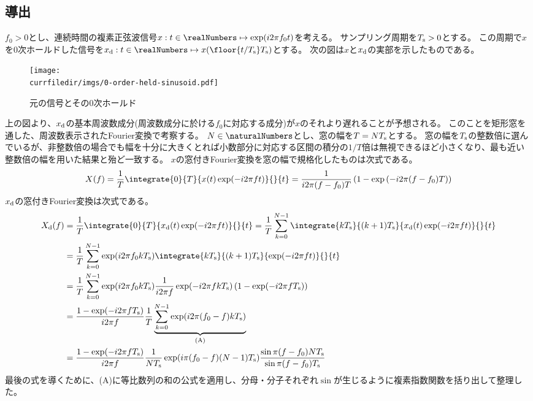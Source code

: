         \subsection{導出}
            $f_0>0$とし、連続時間の複素正弦波信号$x:t\in\realNumbers\mapsto\exp(i 2\pi f_0 t)$を考える。
            サンプリング周期を$T_\text{s}>0$とする。
            この周期で$x$を0次ホールドした信号を$\xd:t\in\realNumbers\mapsto x(\floor{t/\Ts}\Ts)$とする。
            次の図は$x$と$x_\text{d}$の実部を示したものである。
            \begin{figure}[H]
                \centering
                \texttt{[image: \\currfiledir/imgs/0-order-held-sinusoid.pdf]}
                \caption{元の信号とその0次ホールド}
            \end{figure}
            上の図より、$x_\text{d}$の基本周波数成分(周波数成分に於ける$f_0$に対応する成分)が$x$のそれより遅れることが予想される。
            このことを矩形窓を通した、周波数表示されたFourier変換で考察する。
            $N\in\naturalNumbers$とし、窓の幅を$T=NT_\text{s}$とする。
            窓の幅を$T_\text{s}$の整数倍に選んでいるが、非整数倍の場合でも幅を十分に大きくとれば小数部分に対応する区間の積分の$1/T$倍は無視できるほど小さくなり、最も近い整数倍の幅を用いた結果と殆ど一致する。
            $x$の窓付きFourier変換を窓の幅で規格化したものは次式である。
            \[ X(f) = \frac{1}{T} \integrate{0}{T}{x(t)\exp(-i 2\pi f t)}{}{t} = \frac{1}{i 2\pi(f-f_0)T}\left(1-\exp\left(-i 2\pi(f-f_0)T\right)\right) \]
            $x_\text{d}$の窓付きFourier変換は次式である。
            \begin{align*}
                \Xd(f) &= \frac{1}{T}\integrate{0}{T}{\xd(t)\exp(-i 2\pi f t)}{}{t} = \frac{1}{T}\sum_{k=0}^{N-1}\integrate{k\Ts}{(k+1)\Ts}{\xd(t)\exp(-i 2\pi f t)}{}{t} \\
                &= \frac{1}{T}\sum_{k=0}^{N-1}\exp(i 2\pi f_0 k\Ts)\integrate{k\Ts}{(k+1)\Ts}{\exp(-i 2\pi f t)}{}{t} \\
                &= \frac{1}{T}\sum_{k=0}^{N-1}\exp(i 2\pi f_0 k\Ts)\frac{1}{i 2\pi f}\exp(-i 2\pi f k\Ts)\left(1-\exp(-i 2\pi f \Ts)\right) \\
                &= \frac{1-\exp(-i 2\pi f\Ts)}{i 2\pi f}\frac{1}{T}\underbrace{\sum_{k=0}^{N-1}\exp(i 2\pi(f_0-f)k\Ts)}_{\text{(A)}} \\
                &= \frac{1-\exp(-i 2\pi f\Ts)}{i 2\pi f}\frac{1}{N\Ts}\exp(i\pi(f_0-f)(N-1)\Ts)\frac{\sin\pi(f-f_0)N\Ts}{\sin\pi(f-f_0)\Ts}
            \end{align*}
            最後の式を導くために、(A)に等比数列の和の公式を適用し、分母・分子それぞれ$\sin$が生じるように複素指数関数を括り出して整理した。
